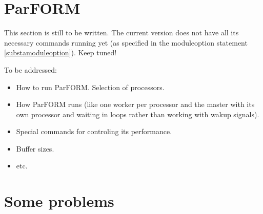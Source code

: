 
\section{ParFORM}
\label{parform}

This section is still to be written. The current version does not have all 
its necessary commands running yet (as specified in the moduleoption 
statement \ref{substamoduleoption}). Keep tuned!

To be addressed:
\begin{itemize}
\item How to run ParFORM. Selection of processors.
\item How ParFORM runs (like one worker per processor and the master with 
its own processor and waiting in loops rather than working with wakup 
signals).
\item Special commands for controling its performance.
\item Buffer sizes.
\item etc.
\end{itemize}


\section{Some problems}

